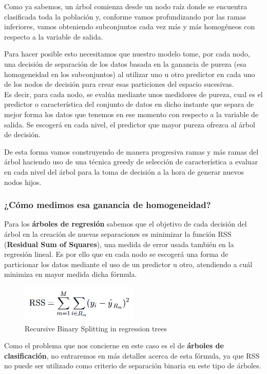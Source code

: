 Como ya sabemos, un árbol comienza desde un nodo raíz donde se encuentra clasificada toda la población y, conforme vamos profundizando por las ramas inferiores, vamos obteniendo subconjuntos cada vez más y más homogéneos con respecto a la variable de salida.

Para hacer posible esto necesitamos que nuestro modelo tome, por cada nodo, una decisión de separación de los datos basada en la ganancia de pureza (esa homogeneidad en los subconjuntos) al utilizar uno u otro predictor en cada uno de los nodos de decisión para crear esas particiones del espacio sucesivas.\\
Es decir, para cada nodo, se evalúa mediante unos medidores de pureza, cual es el predictor o característica del conjunto de datos en dicho instante que separa de mejor forma los datos que tenemos en ese momento con respecto a la variable de salida. Se escogerá en cada nivel, el predictor que mayor pureza ofrezca al árbol de decisión.

De esta forma vamos construyendo de manera progresiva ramas y más ramas del árbol haciendo uso de una técnica greedy de selección de característica a evaluar en cada nivel del árbol para la toma de decisión a la hora de generar nuevos nodos hijos.

\subsubsection{¿Cómo medimos esa ganancia de homogeneidad?}

Para los\textbf{ árboles de regresión} sabemos que el objetivo de cada decisión del árbol en la creación de nuevas separaciones es minimizar la función RSS (\textbf{Residual Sum of Squares}), una medida de error usada también en la regresión lineal. Es por ello que en cada nodo se escogerá una forma de particionar los datos mediante el uso de un predictor u otro, atendiendo a cuál minimiza en mayor medida dicha fórmula.

\begin{figure}[H]
	\centering
	\includegraphics[width=0.5\textwidth]{imagenes/rss} 
	\caption{Recursive Binary Splitting in regression trees \cite{ref6}}
\end{figure}

Como el problema que nos concierne en este caso es el de \textbf{árboles de clasificación}, no entraremos en más detalles acerca de esta fórmula, ya que RSS no puede ser utilizado como criterio de separación binaria en este tipo de árboles.

